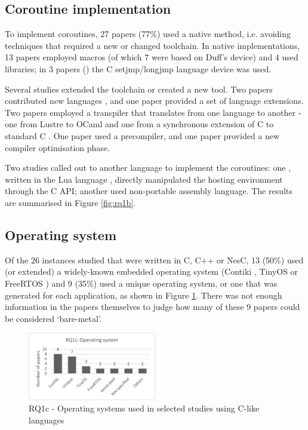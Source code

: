 \documentclass[format=acmsmall, review=false, screen=false]{acmart}
\begin{document}
\subsection{Coroutine implementation}

To implement coroutines, 27 papers (77\%) used a native method, i.e. avoiding techniques that required a new or changed toolchain. In native implementations, 13 papers employed macros (of which 7 were based on Duff’s device) and 4 used libraries; in 3 papers (\cite{Yu2008, Cohen2007b, Kalebe2017}) the C setjmp/longjmp language device was used.

Several studies extended the toolchain or created a new tool. Two papers contributed new languages \cite{Jahier2016, Evers2007}, and one paper \cite{Niebert2014} provided a set of language extensions. Two papers employed a transpiler that translates from one language to another - one from Lustre to OCaml \cite{Jahier2016} and one from a synchronous extension of C to standard C \cite{Karpin2007}. One paper \cite{Fritzsche2010} used a precompiler, and one paper \cite{Jaaskelainen2008} provided a new compiler optimisation phase.

Two studies called out to another language to implement the coroutines: one \cite{Park2015}, written in the Lua language \cite{Moura2004a}, directly manipulated the hosting environment through the C API; another \cite{Khezri2008} used non-portable assembly language. The results are summarised in Figure \ref{fig:rq1b}.

\subsection{Operating system}

Of the 26 instances studied that were written in C, C++ or NesC, 13 (50\%) used (or extended) a widely-known embedded operating system (Contiki \cite{Dunkels2004}, TinyOS \cite{Levis2005} or FreeRTOS \cite{Barry2018}) and 9 (35\%) used a unique operating system, or one that was generated for each application, as shown in Figure \ref{fig:rq1c}. There was not enough information in the papers themselves to judge how many of these 9 papers could be considered ‘bare-metal’.

\begin{figure}[h]
	\includegraphics[width=0.5\textwidth]{RQ1c-Operating-systems-used-in-selected-c-like-studies}
	\caption{RQ1c - Operating systems used in selected studies using C-like languages}
	\label{fig:rq1c}
\end{figure}
\end{document}
